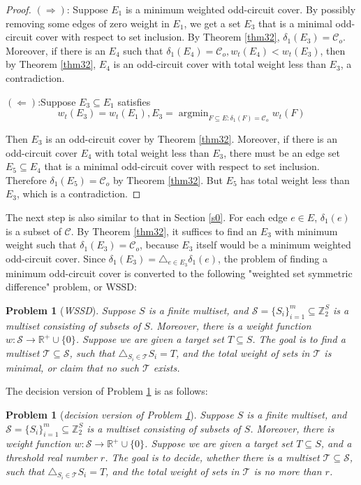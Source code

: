 \documentclass[10pt,fleqn]{article}
\newtheorem{problem}[theorem]{Problem}
\newcommand{\R}{\mathbb{R}}
\newcommand{\Z}{\mathbb{Z}}
\newcommand{\mc}[1]{\mathcal{#1}}
\newcommand{\imp}{\Rightarrow}
\newcommand{\argmin}{\operatorname{argmin}}
\begin{document}
	\begin{proof}
		$(\imp)$: Suppose $E_1$ is a minimum weighted odd-circuit cover. By possibly removing some edges of zero weight in $E_1$, we get a set $E_3$ that is a minimal odd-circuit cover with respect to set inclusion. By Theorem \ref{thm32}, $\delta_1(E_3)=\mc{C}_o$. Moreover, if there is an $E_4$ such that $\delta_1(E_4)=\mc{C}_o,w_t(E_4)<w_t(E_3)$, then by Theorem \ref{thm32}, $E_4$ is an odd-circuit cover with total weight less than $E_3$, a contradiction. \par
		$(\Leftarrow)$:Suppose $E_3\subseteq E_1$ satisfies
		$$w_t(E_3)=w_t(E_1),E_3=\argmin_{F\subseteq E:\delta_1(F)=\mc{C}_o}w_t(F)$$ \par
		Then $E_3$ is an odd-circuit cover by Theorem \ref{thm32}. Moreover, if there is an odd-circuit cover $E_4$ with total weight less than $E_3$, there must be an edge set $E_5\subseteq E_4$ that is a minimal odd-circuit cover with respect to set inclusion. Therefore $\delta_1(E_5)=\mc{C}_o$ by Theorem \ref{thm32}. But $E_5$ has total weight less than $E_3$, which is a contradiction.
	\end{proof} \par
	The next step is also similar to that in Section \ref{s0}. For each edge $e\in E$, $\delta_1(e)$ is a subset of $\mathcal{C}$. By Theorem \ref{thm32}, it suffices to find an $E_3$ with minimum weight such that $\delta_1(E_3)=\mc{C}_o$, because $E_3$ itself would be a minimum weighted odd-circuit cover. Since $\delta_{1}(E_3)=\triangle_{e\in E_3}\delta_1(e)$, the problem of finding a minimum odd-circuit cover is converted to the following "weighted set symmetric difference" problem, or WSSD:
	\begin{problem}[\it{WSSD}]\label{prb31}
		Suppose $S$ is a finite multiset, and $\mathcal{S}=\{S_i\}_{i=1}^{m}\subseteq\Z_2^S$ is a multiset consisting of subsets of $S$. Moreover, there is a weight function $w:\mc{S}\to\R^+\cup\{0\}$. Suppose we are given a target set $T\subseteq S$. The goal is to find a multiset $\mathcal{T}\subseteq\mc{S}$, such that $\triangle_{S_i\in\mc{T}}S_i=T$, and the total weight of sets in $\mc{T}$ is minimal, or claim that no such $\mc{T}$ exists.
	\end{problem} \par
	The decision version of Problem \ref{prb31} is as follows:
	\begin{problem}[\it{decision version of Problem \ref{prb31}}]\label{prb32}
		Suppose $S$ is a finite multiset, and $\mathcal{S}=\{S_i\}_{i=1}^{m}\subseteq\Z_2^S$ is a multiset consisting of subsets of $S$. Moreover, there is weight function $w:\mc{S}\to\R^+\cup\{0\}$. Suppose we are given a target set $T\subseteq S$, and a threshold real number $r$. The goal is to decide, whether there is a multiset $\mathcal{T}\subseteq\mc{S}$, such that $\triangle_{S_i\in\mc{T}}S_i=T$, and the total weight of sets in $\mc{T}$ is no more than $r$.
	\end{problem}
\end{document}
